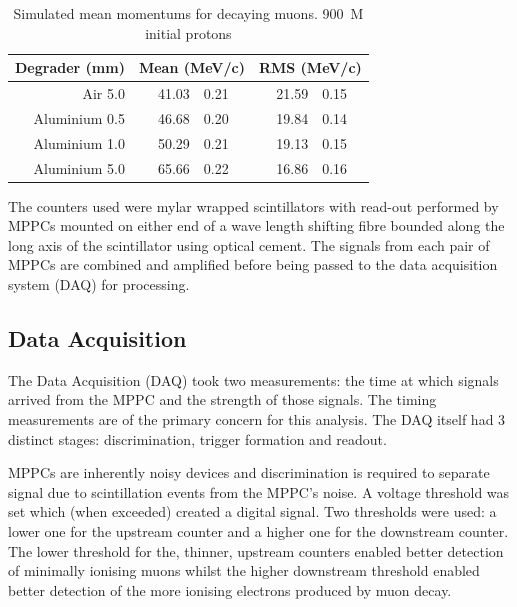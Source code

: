 %
\begin{table}
    \begin{center}
    \begin{tabular}{r|r@{ $\pm$ }l|r@{ $\pm$ }l} %
        Degrader (mm) & \multicolumn{2}{|c|}{Mean (MeV/c)} & \multicolumn{2}{|c}{RMS (MeV/c)}\\
        \hline
        Air 5.0       & 41.03 & 0.21 & 21.59 & 0.15 \\
        Aluminium 0.5 & 46.68 & 0.20 & 19.84 & 0.14 \\
        Aluminium 1.0 & 50.29 & 0.21 & 19.13 & 0.15 \\
        Aluminium 5.0 & 65.66 & 0.22 & 16.86 & 0.16 \\
    \end{tabular}
    \end{center}
    \caption{Simulated mean momentums for decaying muons. 900~M initial protons}
    \label{tab:stopped_muon_mom}
\end{table}
%
The counters used were mylar wrapped scintillators with read-out performed by MPPCs mounted on either end of a wave length shifting fibre bounded along the long axis of the scintillator using optical cement. The signals from each pair of MPPCs are combined and amplified before being passed to the data acquisition system (DAQ) for processing.

\subsection{Data Acquisition} %
\label{sub:data_acquisition}
The Data Acquisition (DAQ) took two measurements: the time at which signals arrived from the MPPC and the strength of those signals. The timing measurements are of the primary concern for this analysis. The DAQ itself had 3 distinct stages: discrimination, trigger formation and readout.

MPPCs are inherently noisy devices and discrimination is required to separate signal due to scintillation events from the MPPC's noise. A voltage threshold was set which (when exceeded) created a digital signal. Two thresholds were used: a lower one for the upstream counter and a higher one for the downstream counter. The lower threshold for the, thinner, upstream counters enabled better detection of minimally ionising muons whilst the higher downstream threshold enabled better detection of the more ionising electrons produced by muon decay. 

